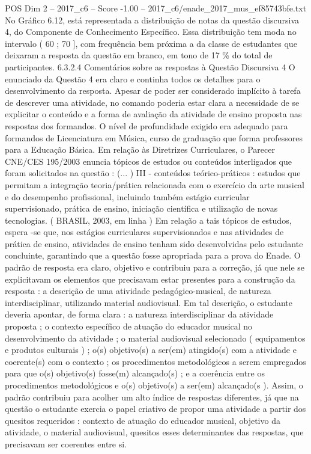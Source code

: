 \begin{textsample}{POS Dim 2 – 2017\_c6 – Score -1.00 – 2017\_c6/enade\_2017\_mus\_ef85743bfe.txt}
No Gráfico 6.12, está representada a distribuição de notas da questão discursiva 4, do Componente de Conhecimento Específico.
Essa distribuição tem moda no intervalo ( 60 ; 70 ], com frequência bem próxima a da classe de estudantes que deixaram a resposta da questão em branco, em tono de 17 \% do total de participantes. 6.3.2.4 Comentários sobre as respostas à Questão Discursiva 4 O enunciado da Questão 4 era claro e continha todos os detalhes para o desenvolvimento da resposta.
Apesar de poder ser considerado implícito à tarefa de descrever uma atividade, no comando poderia estar clara a necessidade de se explicitar o conteúdo e a forma de avaliação da atividade de ensino proposta nas respostas dos formandos.
O nível de profundidade exigido era adequado para formandos de Licenciatura em Música, curso de graduação que forma professores para a Educação Básica.
Em relação às Diretrizes Curriculares, o Parecer CNE/CES 195/2003 enuncia tópicos de estudos ou conteúdos interligados que foram solicitados na questão : (... ) III - conteúdos teórico-práticos : estudos que permitam a integração teoria/prática relacionada com o exercício da arte musical e do desempenho profissional, incluindo também estágio curricular supervisionado, prática de ensino, iniciação científica e utilização de novas tecnologias. ( BRASIL, 2003, em linha ) Em relação a tais tópicos de estudos, espera -se que, nos estágios curriculares supervisionados e nas atividades de prática de ensino, atividades de ensino tenham sido desenvolvidas pelo estudante concluinte, garantindo que a questão fosse apropriada para a prova do Enade.
O padrão de resposta era claro, objetivo e contribuiu para a correção, já que nele se explicitavam os elementos que precisavam estar presentes para a construção da resposta : a descrição de uma atividade pedagógico-musical, de natureza interdisciplinar, utilizando material audiovisual.
Em tal descrição, o estudante deveria apontar, de forma clara : a natureza interdisciplinar da atividade proposta ; o contexto específico de atuação do educador musical no desenvolvimento da atividade ; o material audiovisual selecionado ( equipamentos e produtos culturais ) ; o(s) objetivo(s) a ser(em) atingido(s) com a atividade e coerente(s) com o contexto ; os procedimentos metodológicos a serem empregados para que o(s) objetivo(s) fosse(m) alcançado(s) ; e a coerência entre os procedimentos metodológicos e o(s) objetivo(s) a ser(em) alcançado(s ).
Assim, o padrão contribuiu para acolher um alto índice de respostas diferentes, já que na questão o estudante exercia o papel criativo de propor uma atividade a partir dos quesitos requeridos : contexto de atuação do educador musical, objetivo da atividade, o material audiovisual, quesitos esses determinantes das respostas, que precisavam ser coerentes entre si.

\end{textsample}
